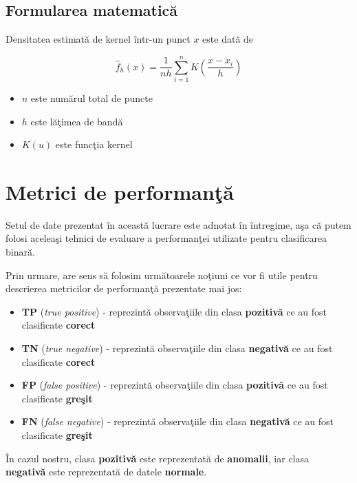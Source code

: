 \subsection{Formularea matematică}

Densitatea estimată de kernel într-un punct $x$ este dată de

\begin{equation}
\hat{f}_h(x) = \frac{1}{nh} \sum_{i=1}^{n} K\left(\frac{x - x_i}{h}\right)
\end{equation}

\begin{itemize}
    \item $n$ este numărul total de puncte
    \item $h$ este lăţimea de bandă
    \item $K(u)$ este funcţia kernel 
\end{itemize}

\section{Metrici de performanţă}

Setul de date prezentat în această lucrare este adnotat în întregime, aşa 
că putem folosi aceleaşi tehnici de evaluare a performanţei utilizate pentru
clasificarea binară.

Prin urmare, are sens să folosim următoarele noţiuni ce vor fi utile pentru
descrierea metricilor de performanţă prezentate mai jos:

\begin{itemize}
    \item \textbf{TP} (\textit{true positive}) - reprezintă observaţiile din clasa 
    \textbf{pozitivă} ce au fost clasificate \textbf{corect}
    \item \textbf{TN} (\textit{true negative}) - reprezintă observaţiile din clasa 
    \textbf{negativă} ce au fost clasificate \textbf{corect}
    \item \textbf{FP} (\textit{false positive}) - reprezintă observaţiile din clasa 
    \textbf{pozitivă} ce au fost clasificate \textbf{greşit}
    \item \textbf{FN} (\textit{false negative}) - reprezintă observaţiile din clasa 
    \textbf{negativă} ce au fost clasificate \textbf{greşit}
\end{itemize}
În cazul nostru, clasa \textbf{pozitivă} este reprezentată de \textbf{anomalii}, iar 
clasa \textbf{negativă} este reprezentată de datele \textbf{normale}.

